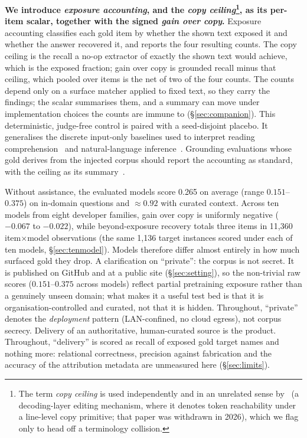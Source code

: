 \documentclass[10pt,twocolumn]{article}
\begin{document}
\textbf{We introduce \emph{exposure accounting}, and the \emph{copy ceiling}\footnote{The term \emph{copy ceiling} is used independently and in an unrelated sense by~\textcite{copyasdecode2026} (a decoding-layer editing mechanism, where it denotes token reachability under a line-level copy primitive; that paper was withdrawn in 2026), which we flag only to head off a terminology collision.}, as its per-item scalar, together with the signed \emph{gain over copy}.} Exposure accounting classifies each gold item by whether the shown text exposed it and whether the answer recovered it, and reports the four resulting counts. The copy ceiling is the recall a no-op extractor of exactly the shown text would achieve, which is the exposed fraction; gain over copy is grounded recall minus that ceiling, which pooled over items is the net of two of the four counts. The counts depend only on a surface matcher applied to fixed text, so they carry the findings; the scalar summarises them, and a summary can move under implementation choices the counts are immune to (\S\ref{sec:companion}). This deterministic, judge-free control is paired with a seed-disjoint placebo. It generalises the discrete input-only baselines used to interpret reading comprehension~\cite{kaushik2018reading} and natural-language inference~\cite{gururangan2018artifacts,poliak2018hypothesis}. Grounding evaluations whose gold derives from the injected corpus should report the accounting as standard, with the ceiling as its summary~\cite{laitenberger2025stronger,min2023factscore}.

Without assistance, the evaluated models score 0.265 on average (range $0.151$--$0.375$) on in-domain questions and $\approx0.92$ with curated context. Across ten models from eight developer families, gain over copy is uniformly negative ($-0.067$ to $-0.022$), while beyond-exposure recovery totals three items in 11{,}360 item$\times$model observations (the same 1{,}136 target instances scored under each of ten models, \S\ref{sec:tenmodel}). Models therefore differ almost entirely in how much surfaced gold they drop. A clarification on ``private'': the corpus is not secret. It is published on GitHub and at a public site (\S\ref{sec:setting}), so the non-trivial raw scores ($0.151$--$0.375$ across models) reflect partial pretraining exposure rather than a genuinely unseen domain; what makes it a useful test bed is that it is organisation-controlled and curated, not that it is hidden. Throughout, ``private'' denotes the \emph{deployment} pattern (LAN-confined, no cloud egress), not corpus secrecy. Delivery of an authoritative, human-curated source is the product. Throughout, ``delivery'' is scored as recall of exposed gold target names and nothing more: relational correctness, precision against fabrication and the accuracy of the attribution metadata are unmeasured here (\S\ref{sec:limits}).
\end{document}
